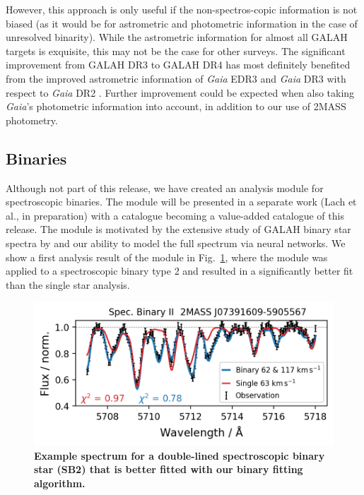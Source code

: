 \documentclass[
  journal=pasa,
  manuscript=research-paper, %
  year=2024,
  volume=37
]{cup-journal}
\begin{document}
However, this approach is only useful if the non-spectros-copic information is not biased (as it would be for astrometric and photometric information in the case of unresolved binarity). While the astrometric information for almost all GALAH targets is exquisite, this may not be the case for other surveys. The significant improvement from GALAH DR3 to GALAH DR4 has most definitely benefited from the improved astrometric information of \textit{Gaia} EDR3 \citep{GaiaEDR3, Lindegren2021a} and \textit{Gaia} DR3 \citep{GaiaDR3} with respect to \textit{Gaia} DR2 \citep{Brown2018, Lindegren2018}. Further improvement could be expected when also taking \textit{Gaia}'s photometric information into account, in addition to our use of 2MASS photometry.

\subsection{Binaries} \label{sec:caveats_binaries}

Although not part of this release, we have created an analysis module for spectroscopic binaries. The module will be presented in a separate work (Lach et al., in preparation) with a catalogue becoming a value-added catalogue of this release. The module is motivated by the extensive study of GALAH binary star spectra by \citet{Traven2020} and our ability to model the full spectrum via neural networks. We show a first analysis result of the module in Fig.~\ref{fig:examples_flag_sp_3}, where the module was applied to a spectroscopic binary type 2 and resulted in a significantly better fit than the single star analysis.

\begin{figure}[ht]
 \centering
 \includegraphics[width=\textwidth]{figures/examples_flag_sp_3.png}
 \caption{\textbf{Example spectrum for a double-lined spectroscopic binary star (SB2) that is better fitted with our binary fitting algorithm.}} \label{fig:examples_flag_sp_3}
\end{figure}
\end{document}
